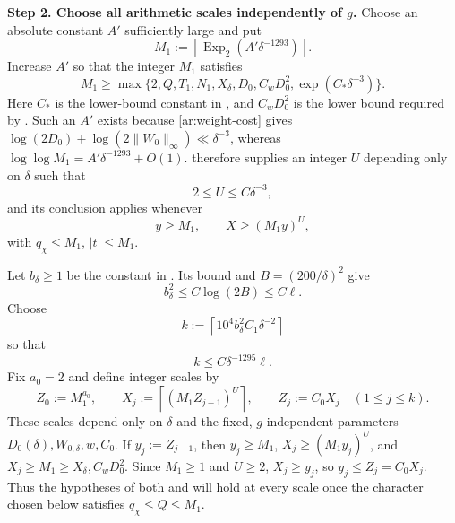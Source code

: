 \documentclass[twoside]{aomart}
\makeatletter
\theoremstyle{paperplain}
\theoremstyle{paperdefinition}
\renewenvironment{proof}[1][\proofname]{\par\pushQED{\qed}%
  \normalfont\topsep6\p@\@plus3\p@\relax\trivlist
  \item[\hskip\labelsep\itshape #1\@addpunct{.}]\ignorespaces
}{\popQED\endtrivlist\@endpefalse}
\numberwithin{equation}{section}
\makeatother
\begin{document}
\begin{proof}
\par
\medskip
\noindent\textbf{Step 2. Choose all arithmetic scales independently of $g$.}
Choose an absolute constant $A'$ sufficiently large and put
\begin{equation}
 M_1:=\left\lceil\operatorname{Exp}_2(A'\delta^{-1293})\right\rceil.
 \label{main:initial-parameter}
\end{equation}
Increase $A'$ so that the integer $M_1$ satisfies
\begin{equation*}
 M_1\ge\max\{2,Q,T_1,N_1,X_\delta,D_0,
 C_wD_0^2,\exp(C_*\delta^{-3})\}.
\end{equation*}
Here $C_*$ is the lower-bound constant in
, and $C_wD_0^2$ is the lower bound required
by .  Such an $A'$ exists because
\eqref{ar:weight-cost} gives
$\log(2D_0)+\log(2\|W_0\|_\infty)\ll\delta^{-3}$, whereas
$\log\log M_1=A'\delta^{-1293}+O(1)$.  
therefore supplies an integer $U$ depending only on $\delta$ such that
\begin{equation*}
 2\le U\le C\delta^{-3},
\end{equation*}
and its conclusion applies whenever
\begin{equation*}
 y\ge M_1,\qquad X\ge(M_1y)^U,
\end{equation*}
with $q_\chi\le M_1$, $|t|\le M_1$.

Let $b_\delta\ge1$ be the constant in .  Its
bound and $B=(200/\delta)^2$ give
\begin{equation*}
 b_\delta^2\le C\log(2B)\le C\ell.
\end{equation*}
Choose
\begin{equation*}
 k:=\left\lceil10^4b_\delta^2C_1\delta^{-2}\right\rceil
\end{equation*}
so that
\begin{equation}
 k\le C\delta^{-1295}\ell.
 \label{main:number-of-scales-bound}
\end{equation}
Fix $a_0=2$ and define integer scales by
\begin{equation}
 Z_0:=M_1^{a_0},\qquad
 X_j:=\left\lceil(M_1Z_{j-1})^U\right\rceil,\qquad
 Z_j:=C_0X_j\quad(1\le j\le k).
 \label{main:scale-sequence}
\end{equation}
These scales depend only on $\delta$ and the fixed, $g$-independent parameters $D_0(\delta),W_{0,\delta},w,C_0$.  If
$y_j:=Z_{j-1}$, then $y_j\ge M_1$, $X_j\ge(M_1y_j)^U$, and
$X_j\ge M_1\ge X_\delta,C_wD_0^2$.  Since $M_1\ge1$ and $U\ge2$,
$X_j\ge y_j$, so $y_j\le Z_j=C_0X_j$.  Thus the hypotheses of both
 and  will hold at every
scale once the character chosen below satisfies $q_\chi\le Q\le M_1$.


\end{proof}
\end{document}
